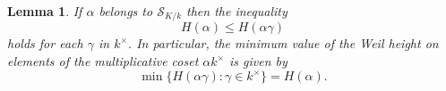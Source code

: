 \documentclass[11pt]{amsart}
\newtheorem{lemma}{Lemma}[section]
\numberwithin{equation}{eqncounter}
\def\NKk{\mathcal{S}_{K/k}}
\def\Sc{\mathcal{S}}
\begin{document}





\begin{lemma}\label{lemfirst5}   If $\alpha$ belongs to $\NKk$ then the inequality
\begin{equation}\label{eleventh238}
H(\alpha) \le H(\alpha \gamma)
\end{equation}
holds for each $\gamma$ in $k^{\times}$.
In particular, the minimum value of the Weil height on 
elements of the multiplicative coset $\alpha k^{\times}$ is given by
\begin{equation*}\label{eleventh280}
\min\big\{H(\alpha \gamma) : \gamma \in k^{\times}\big\} = H(\alpha).
\end{equation*}     
\end{lemma}
\end{document}
